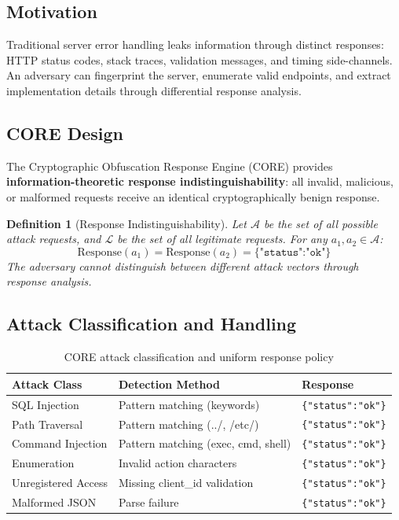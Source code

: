 \documentclass{article}
\newtheorem{definition}{Definition}[section]
\begin{document}
\subsection{Motivation}

Traditional server error handling leaks information through distinct responses: HTTP status codes, stack traces, validation messages, and timing side-channels. An adversary can fingerprint the server, enumerate valid endpoints, and extract implementation details through differential response analysis.

\subsection{CORE Design}

The Cryptographic Obfuscation Response Engine (CORE) provides \textbf{information-theoretic response indistinguishability}: all invalid, malicious, or malformed requests receive an identical cryptographically benign response.

\begin{definition}[Response Indistinguishability]
Let $\mathcal{A}$ be the set of all possible attack requests, and $\mathcal{L}$ be the set of all legitimate requests. For any $a_1, a_2 \in \mathcal{A}$:
\begin{equation}
\text{Response}(a_1) = \text{Response}(a_2) = \texttt{\{"status":"ok"\}}
\end{equation}
The adversary cannot distinguish between different attack vectors through response analysis.
\end{definition}

\subsection{Attack Classification and Handling}

\begin{table}[H]
\centering
\begin{tabular}{|l|l|l|}
\hline
\textbf{Attack Class} & \textbf{Detection Method} & \textbf{Response} \\
\hline
SQL Injection & Pattern matching (keywords) & \texttt{\{"status":"ok"\}} \\
Path Traversal & Pattern matching (../, /etc/) & \texttt{\{"status":"ok"\}} \\
Command Injection & Pattern matching (exec, cmd, shell) & \texttt{\{"status":"ok"\}} \\
Enumeration & Invalid action characters & \texttt{\{"status":"ok"\}} \\
Unregistered Access & Missing client\_id validation & \texttt{\{"status":"ok"\}} \\
Malformed JSON & Parse failure & \texttt{\{"status":"ok"\}} \\
\hline
\end{tabular}
\caption{CORE attack classification and uniform response policy}
\end{table}
\end{document}
